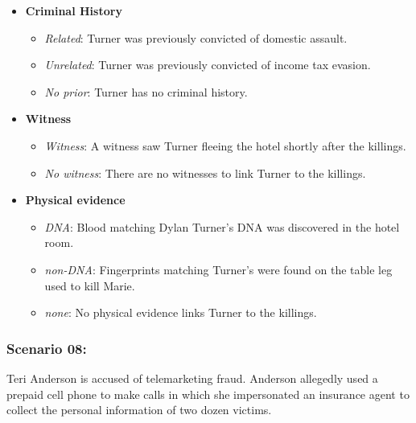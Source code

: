 \documentclass[
]{article}
\providecommand{\tightlist}{%
  \setlength{\itemsep}{0pt}\setlength{\parskip}{0pt}}
\begin{document}
\begin{itemize}
\tightlist
\item
  \textbf{Criminal History}

  \begin{itemize}
  \tightlist
  \item
    \emph{Related}: Turner was previously convicted of domestic assault.
  \item
    \emph{Unrelated}: Turner was previously convicted of income tax
    evasion.
  \item
    \emph{No prior}: Turner has no criminal history.
  \end{itemize}
\item
  \textbf{Witness}

  \begin{itemize}
  \tightlist
  \item
    \emph{Witness}: A witness saw Turner fleeing the hotel shortly after
    the killings.
  \item
    \emph{No witness}: There are no witnesses to link Turner to the
    killings.
  \end{itemize}
\item
  \textbf{Physical evidence}

  \begin{itemize}
  \tightlist
  \item
    \emph{DNA}: Blood matching Dylan Turner's DNA was discovered in the
    hotel room.
  \item
    \emph{non-DNA}: Fingerprints matching Turner's were found on the
    table leg used to kill Marie.
  \item
    \emph{none}: No physical evidence links Turner to the killings.
  \end{itemize}
\end{itemize}

\hypertarget{scenario-08}{%
\subsubsection{Scenario 08:}\label{scenario-08}}

Teri Anderson is accused of telemarketing fraud. Anderson allegedly used
a prepaid cell phone to make calls in which she impersonated an
insurance agent to collect the personal information of two dozen
victims.
\end{document}
